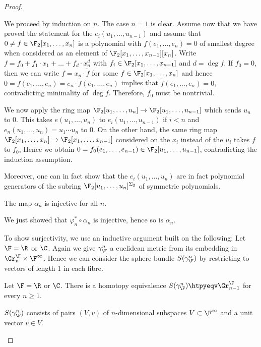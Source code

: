 \begin{proof}
\begin{smallproof}
		We proceed by induction on $n$.
		The case $n = 1$ is clear.
		Assume now that we have proved the statement for the $e_i(u_1, \ldots, u_{n - 1})$ and assume that $0 \neq f \in \F_2[x_1, \ldots, x_n]$ is a polynomial with $f(e_1, \ldots, e_n) = 0$ of smallest degree when considered as an element of $\F_2[x_1, \ldots, x_{n - 1}][x_n]$.
		Write $f = f_0 + f_1 \cdot x_1 + \ldots + f_d \cdot x_n^d$ with $f_i \in \F_2[x_1, \ldots, x_{n - 1}]$ and $d = \deg f$.
		If $f_0 = 0$, then we can write $f = x_n \cdot \tilde{f}$ for some $f \in \F_2[x_1, \ldots, x_n]$ and hence $0 = f(e_1, \ldots, e_n) = e_n \cdot \tilde{f}(e_1, \ldots, e_n)$ implies that $\tilde{f}(e_1, \ldots, e_n) = 0$, contradicting minimality of $\deg f$.
		Therefore, $f_0$ must be nontrivial.

		We now apply the ring map $\F_2[u_1, \ldots, u_n] \to \F_2[u_1, \ldots, u_{n - 1}]$ which sends $u_n$ to 0.
		This takes $e(u_1, \ldots, u_n)$ to $e_i(u_1, \ldots, u_{n - 1})$ if $i < n$ and $e_n(u_1, \ldots, u_n) = u_1 \cdots u_n$ to 0.
		On the other hand, the same ring map $\F_2[x_1, \ldots, x_n] \to \F_2[x_1, \ldots, x_{n - 1}]$ considered on the $x_i$ instead of the $u_i$ takes $f$ to $f_0$, 
		Hence we obtain $0 = f_0(e_1, \ldots, e_{n - 1}) \in \F_2[u_1, \ldots, u_{n - 1}]$, contradicting the induction assumption.
	\end{smallproof}
	Moreover, one can in fact show that the $e_i(u_1, \ldots, u_n)$ are in fact polynomial generators of the subring $\F_2[u_1, \ldots, u_n]^{\Sigma_2}$ of symmetric polynomials.
	\begin{corollary}
		The map $\alpha_n$ is injective for all $n$.
	\end{corollary}
	\begin{smallproof}
		We just showed that $\varphi_n^* \circ \alpha_n$ is injective, hence so is $\alpha_n$.
	\end{smallproof}
	To show surjectivity, we use an inductive argument built on the following:
	Let $\F = \R$ or $\C$.
	Again we give $\gamma_\F^n$ a euclidean metric from its embedding in $\Gr_n^\F \times \F^\infty$.
	Hence we can consider the sphere bundle $S(\gamma_\F^n)$ by restricting to vectors of length 1 in each fibre.
	\begin{proposition}\label{prop:spherebdlhtpygrassmannian}
		Let $\F = \R$ or $\C$.
		There is a homotopy equivalence $S(\gamma_\F^n) \htpyeqv \Gr^\F_{n - 1}$ for every $n \geq 1$.
	\end{proposition}
	\begin{smallproof}
		$S(\gamma_\F^n)$ consists of pairs $(V, v)$ of $n$-dimensional subspaces $V \subset \F^\infty$ and a unit vector $v \in V$.

\end{smallproof}
\end{proof}
